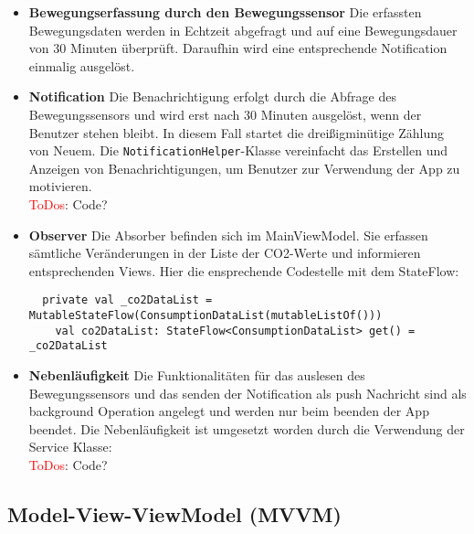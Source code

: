 \documentclass{article}
\begin{document}
\begin{itemize}
\item \textbf{Bewegungserfassung durch den Bewegungssensor}
Die erfassten Bewegungsdaten werden in Echtzeit abgefragt und auf eine Bewegungsdauer von 30 Minuten überprüft. Daraufhin wird eine entsprechende Notification einmalig ausgelöst.

\item \textbf{Notification}
Die Benachrichtigung erfolgt durch die Abfrage des Bewegungssensors und wird erst nach 30 Minuten ausgelöst, wenn der Benutzer stehen bleibt. In diesem Fall startet die dreißigminütige Zählung von Neuem.  Die \texttt{NotificationHelper}-Klasse vereinfacht das Erstellen und Anzeigen von Benachrichtigungen, um Benutzer zur Verwendung der App zu motivieren.\\\textcolor{red}{ToDos}: Code?

\item \textbf{Observer}
Die Absorber befinden sich im MainViewModel. Sie erfassen sämtliche Veränderungen in der Liste der CO2-Werte und informieren entsprechenden Views.
Hier die ensprechende Codestelle mit dem StateFlow:
\begin{lstlisting}
  private val _co2DataList = MutableStateFlow(ConsumptionDataList(mutableListOf()))
    val co2DataList: StateFlow<ConsumptionDataList> get() = _co2DataList
\end{lstlisting}

\item \textbf{Nebenläufigkeit}
Die Funktionalitäten für das auslesen des Bewegungssensors und das senden der Notification als push Nachricht sind als background Operation angelegt und werden nur beim beenden der App beendet. Die Nebenläufigkeit ist umgesetzt worden durch die Verwendung der Service Klasse:\\\textcolor{red}{ToDos}: Code?

\end{itemize}


\subsection{ Model-View-ViewModel (MVVM)}
\end{document}
